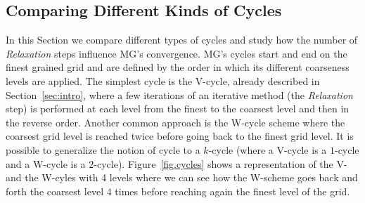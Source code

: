 
\subsection{Comparing Different Kinds of Cycles}

In this Section we compare different types of cycles and study how the number of \textit{Relaxation} steps influence MG's convergence.
MG's cycles start and end on the finest grained grid and are defined by the order in which its different coarseness levels are applied.
The simplest cycle is the V-cycle, already described in Section~\ref{sec:intro}, where a few iterations
  of an iterative method (the \textit{Relaxation} step) is performed at each level from the finest to the coarsest level and then in the reverse order. 
Another common approach is the W-cycle scheme where the coarsest grid level is reached twice before going back to the finest grid level.
It is possible to generalize the notion of cycle to a $k$-cycle (where a V-cycle is a $1$-cycle and a W-cycle is a $2$-cycle).
Figure~\ref{fig.cycles} shows a representation of the V- and the W-cyles with 4 levels where we can see how the W-scheme goes back and forth the coarsest level 4 times before reaching again the finest level of the grid.

  
  
